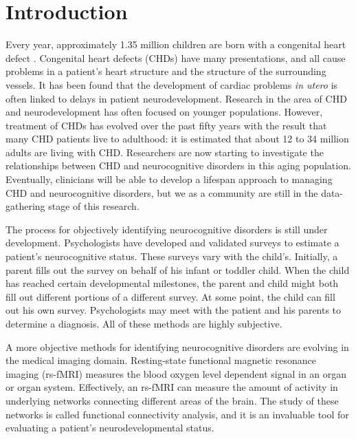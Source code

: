 \chapter{Introduction}
\label{ch:intro}

Every year, approximately 1.35 million children are born with a congenital heart defect \cite{VanderLinde2011}. Congenital heart defects (CHDs) have many presentations, and all cause problems in a patient's heart structure and the structure of the surrounding vessels. It has been found that the development of cardiac problems \textit{in utero} is often linked to delays in patient neurodevelopment. Research in the area of CHD and neurodevelopment has often focused on younger populations. However, treatment of CHDs has evolved over the past fifty years with the result that many CHD patients live to adulthood: it is estimated that about 12 to 34 million adults are living with CHD. Researchers are now starting to investigate the relationships between CHD and neurocognitive disorders in this aging population. Eventually, clinicians will be able to develop a lifespan approach to managing CHD and neurocognitive disorders, but we as a community are still in the data-gathering stage of this research.

The process for objectively identifying neurocognitive disorders is still under development. Psychologists have developed and validated surveys to estimate a patient's neurocognitive status. These surveys vary with the child's. Initially, a parent fills out the survey on behalf of his infant or toddler child. When the child has reached certain developmental milestones, the parent and child might both fill out different portions of a different survey. At some point, the child can fill out his own survey. Psychologists may meet with the patient and his parents to determine a diagnosis. All of these methods are highly subjective. 

A more objective methods for identifying neurocognitive disorders are evolving in the medical imaging domain. 
Resting-state functional magnetic resonance imaging (rs-fMRI) measures the blood oxygen level dependent signal in an organ or organ system. Effectively, an rs-fMRI can measure the amount of activity in underlying networks connecting different areas of the brain. The study of these networks is called functional connectivity analysis, and it is an invaluable tool for evaluating a patient's neurodevelopmental status. 

